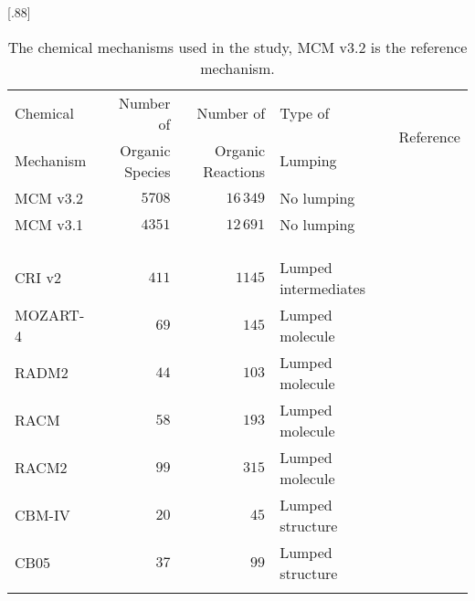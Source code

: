 \documentclass[acpd, online, hvmath]{copernicus}
\begin{document}
\begin{table}[t]
    \caption{The chemical mechanisms used in the study, MCM v3.2 is the reference mechanism.}
\scalebox{.88}[.88]{\begin{tabular}{lrrll}
        \tophline
        {Chemical} &{Number of} &{Number of} &{Type of} &\multirow{2}{*}{{Reference}} \\
        {Mechanism} &{Organic Species} &{Organic Reactions} &{Lumping}
        &\\
\middlehline
        MCM v3.2 &$5708$ &$16\,349$ &No lumping &\citet{MCM_Site} \\
        {MCM v3.1} &{$4351$} &{$12\,691$} &{No lumping} &\citet{Jenkin:1997} \\
        &&&&\citet{Saunders:2003} \\
        &&&&\citet{Jenkin:2003} \\
        &&&&\citet{Bloss:2005} \\
        CRI v2 &$411$ &$1145$ &Lumped intermediates &\citet{Jenkin:2008} \\
        MOZART-4 &$69$ &$145$ &Lumped molecule &\citet{Emmons:2010} \\
        RADM2 &$44$ &$103$ &Lumped molecule &\citet{Stockwell:1990} \\
        RACM &$58$ &$193$ &Lumped molecule &\citet{Stockwell:1997} \\
        RACM2 &$99$ &$315$ &Lumped molecule &\citet{Goliff:2013} \\
        CBM-IV &$20$ &$45$ &Lumped structure &\citet{Gery:1989} \\
        CB05 &$37$ &$99$ &Lumped structure &\citet{Yarwood:2005} \\
        \bottomhline
    \end{tabular}}
\label{t:mechanisms}
\end{table}
\end{document}

